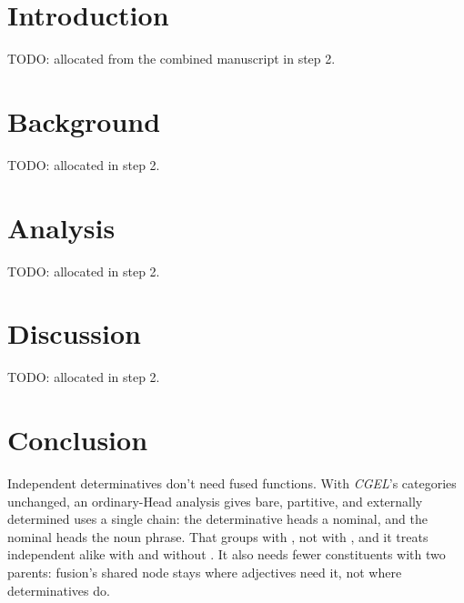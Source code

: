 \documentclass[12pt]{article}
\begin{document}
\section{Introduction}

TODO: allocated from the combined manuscript in step 2.

\section{Background}

TODO: allocated in step 2.

\section{Analysis}

TODO: allocated in step 2.

\section{Discussion}

TODO: allocated in step 2.

\section{Conclusion}\label{sec:conclusion}

Independent determinatives don't need fused functions. With \textit{CGEL}'s categories unchanged, an ordinary-Head analysis gives bare, partitive, and externally determined uses a single chain: the determinative heads a nominal, and the nominal heads the noun phrase. That groups  with , not with , and it treats independent  alike with and without . It also needs fewer constituents with two parents: fusion's shared node stays where adjectives need it, not where determinatives do.
\end{document}
